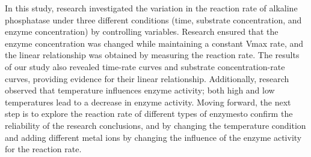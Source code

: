 \documentclass[a4paper,10pt]{article}
\begin{document}
\begin{multicols}{2}
In this study, research investigated the variation in the reaction rate of alkaline phosphatase under three different conditions (time, substrate concentration, and enzyme concentration) by controlling variables. Research ensured that the enzyme concentration was changed while maintaining a constant Vmax rate, and the linear relationship was obtained by measuring the reaction rate. The results of our study also revealed time-rate curves and substrate concentration-rate curves, providing evidence for their linear relationship. Additionally, research observed that temperature influences enzyme activity; both high and low temperatures lead to a decrease in enzyme activity. Moving forward, the next step is to explore the reaction rate of different types of enzymesto confirm the reliability of the research conclusions, and by changing the temperature condition and adding different metal ions by changing the influence of the enzyme activity for the reaction rate.





\end{multicols}


\clearpage
\end{document}

